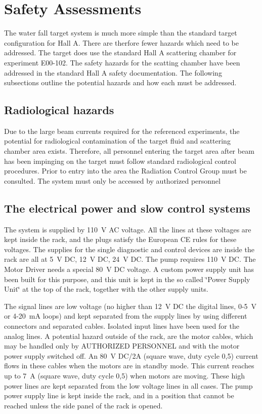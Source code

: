 \section{Safety Assessments}

The water fall target system is much more simple than the standard
target configuration for Hall A. There are therfore fewer hazards
which need to be addressed. The target does use the standard Hall
A scattering chamber for experiment E00-102. The safety hazards for
the scatting chamber have been addressed in the standard Hall A safety
documentation. The following subsections outline the potential hazards
and how each must be addressed.


\subsection{Radiological hazards}

Due to the large beam currents required for the referenced experiments,
the potential for radiological contamination of the target fluid and
scattering chamber area exists. Therefore, all personnel entering
the target area after beam has been impinging on the target must follow
standard radiological control procedures. Prior to entry into the
area the Radiation Control Group must be consulted. The system must
only be accessed by authorized personnel


\subsection{The electrical power and slow control systems}

The system is supplied by 110~V AC voltage. All the lines at these
voltages are kept inside the rack, and the plugs satisfy the European
CE rules for these voltages. The supplies for the single diagnostic
and control devices are inside the rack are all at 5~V DC, 12~V
DC, 24~V DC. The pump requires 110~V DC. The Motor Driver needs
a special 80~V DC voltage. A custom power supply unit has been built
for this purpose, and this unit is kept in the so called \char`\"{}Power
Supply Unit\char`\"{} at the top of the rack, together with the other
supply units. 

The signal lines are low voltage (no higher than 12~V DC the digital
lines, 0-5~V or 4-20~mA loops) and kept separated from the supply
lines by using different connectors and separated cables. Isolated
input lines have been used for the analog lines. A potential hazard
outside of the rack, are the motor cables, which may be handled only
by AUTHORIZED PERSONNEL and with the motor power supply switched off.
An 80~V DC/2A (square wave, duty cycle 0,5) current flows in these
cables when the motors are in standby mode. This current reaches up
to 7~A (square wave, duty cycle 0,5) when motors are moving. These
high power lines are kept separated from the low voltage lines in
all cases. The pump power supply line is kept inside the rack, and
in a position that cannot be reached unless the side panel of the
rack is opened.


